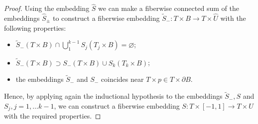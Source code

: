 \documentclass[12pt]{paper}
\theoremstyle{plain}
\theoremstyle{definition}
\newcommand{\wt}{\widetilde}
\newcommand{\wh}{\widehat}
\newcommand{\p}{\partial}
\numberwithin{figure}{section}
\begin{document}
\begin{proof}
 
   Using the embedding $\wh S$ we can make a fiberwise connected sum of the   embeddings $\wh S_\pm$ to construct a  fiberwise embedding $\wt S_-:T\times B\to T\times \wh U$ with the following properties:
   \begin{itemize} 
   \item $\wt S_-(T\times B)\cap \bigcup\limits_1^{k-1}S_j(T_j\times B)=\varnothing$;
\item $\wt S_-(T\times B)\supset S_-(T\times B)\cup S_k(T_k\times B)$;
\item the embeddings $\wt S_-$ and $S_-$ coincides   near  $T\times p\in T\times \p B$.
   \end{itemize}
   
Hence, by applying again  the inductional hypothesis to the  embeddings $\wt S_-, S$ and $S_j, j=1,\dots k-1$, we can construct a fiberwise  embedding
$S:T \times [-1,1]\to T\times U$ with the required properties.

        \end{proof}
\end{document}
